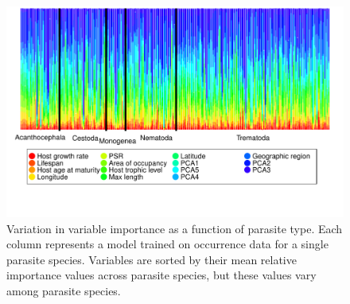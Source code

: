 \documentclass[12pt]{article}
\begin{document}
  
 \newpage
 \begin{figure}[h!]
  \includegraphics[width=\textwidth]{../Figures/parTypeColor.pdf}
  \caption{Variation in variable importance as a function of parasite type. Each column represents a model trained on occurrence data for a single parasite species. Variables are sorted by their mean relative importance values across parasite species, but these values vary among parasite species.}
 \label{fig:parType}
 \end{figure}


 
 
\end{document}
